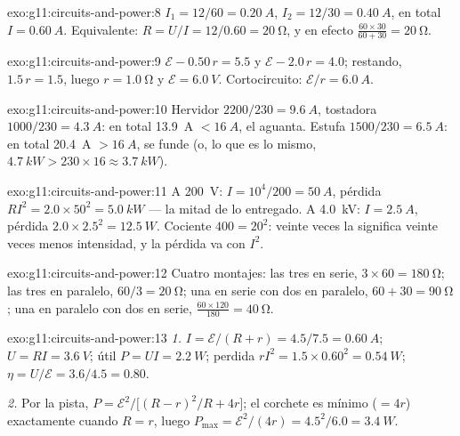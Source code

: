 \begin{solution}{exo:g11:circuits-and-power:8}
$I_1 = 12/60 = \qty{0.20}{A}$, $I_2 = 12/30 = \qty{0.40}{A}$, en total
$I = \qty{0.60}{A}$. Equivalente: $R = U/I = 12/0.60 = \qty{20}{\ohm}$,
y en efecto $\frac{60 \times 30}{60 + 30} = \qty{20}{\ohm}$.
\end{solution}

\begin{solution}{exo:g11:circuits-and-power:9}
$\mathcal{E} - 0.50\,r = 5.5$ y $\mathcal{E} - 2.0\,r = 4.0$; restando,
$1.5\,r = 1.5$, luego $r = \qty{1.0}{\ohm}$ y
$\mathcal{E} = \qty{6.0}{V}$. Cortocircuito:
$\mathcal{E}/r = \qty{6.0}{A}$.
\end{solution}

\begin{solution}{exo:g11:circuits-and-power:10}
Hervidor $2200/230 = \qty{9.6}{A}$, tostadora
$1000/230 = \qty{4.3}{A}$: en total \qty{13.9}{A} $< \qty{16}{A}$, el
 aguanta. Estufa $1500/230 = \qty{6.5}{A}$: en total
\qty{20.4}{A} $> \qty{16}{A}$, se funde (o, lo que es lo mismo,
$\qty{4.7}{kW} > 230 \times 16 \approx \qty{3.7}{kW}$).
\end{solution}

\begin{solution}{exo:g11:circuits-and-power:11}
A \qty{200}{V}: $I = 10^4/200 = \qty{50}{A}$, pérdida
$RI^2 = 2.0 \times 50^2 = \qty{5.0}{kW}$ --- la mitad de lo entregado. A
\qty{4.0}{kV}: $I = \qty{2.5}{A}$, pérdida
$2.0 \times 2.5^2 = \qty{12.5}{W}$. Cociente $400 = 20^2$: veinte veces
la  significa veinte veces menos intensidad, y la pérdida va con
$I^2$.
\end{solution}

\begin{solution}{exo:g11:circuits-and-power:12}
Cuatro montajes: las tres en serie, $3 \times 60 = \qty{180}{\ohm}$; las
tres en paralelo, $60/3 = \qty{20}{\ohm}$; una en serie con dos en
paralelo, $60 + 30 = \qty{90}{\ohm}$; una en paralelo con dos en serie,
$\frac{60 \times 120}{180} = \qty{40}{\ohm}$.
\end{solution}

\begin{solution}{exo:g11:circuits-and-power:13}
\emph{1.} $I = \mathcal{E}/(R + r) = 4.5/7.5 = \qty{0.60}{A}$;
$U = RI = \qty{3.6}{V}$;  útil $P = UI = \qty{2.2}{W}$; perdida
$rI^2 = 1.5 \times 0.60^2 = \qty{0.54}{W}$;
$\eta = U/\mathcal{E} = 3.6/4.5 = 0.80$.

\emph{2.} Por la pista,
$P = \mathcal{E}^2 \big/ \big[(R - r)^2/R + 4r\big]$; el corchete es
mínimo ($= 4r$) exactamente cuando $R = r$, luego
$P_{\max} = \mathcal{E}^2/(4r) = 4.5^2/6.0 = \qty{3.4}{W}$.
\end{solution}

